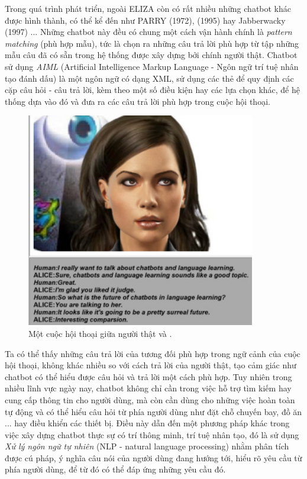 \documentclass[12pt]{report}
\begin{document}
Trong quá trình phát triển, ngoài ELIZA còn có rất nhiều những chatbot khác được hình thành, có thể kể đến như PARRY (1972), \alice{} (1995) hay Jabberwacky (1997) ... Những chatbot này đều có chung một cách vận hành chính là \textit{pattern matching} (phù hợp mẫu), tức là chọn ra những câu trả lời phù hợp từ tập những mẫu câu đã có sẵn trong hệ thống được xây dựng bởi chính người thật. Chatbot \alice{} sử dụng \textit{AIML} (Artificial Intelligence Markup Language - Ngôn ngữ trí tuệ nhân tạo đánh dấu) là một ngôn ngữ có dạng XML, sử dụng các thẻ để quy định các cặp câu hỏi - câu trả lời, kèm theo một số điều kiện hay các lựa chọn khác, để hệ thống dựa vào đó và đưa ra các câu trả lời phù hợp trong cuộc hội thoại.

\begin{figure}[H]
  \centering
    \includegraphics[width=10cm]{Pics/Chap1/alice.jpg}
  \caption{Một cuộc hội thoại giữa người thật và \alice{}.}
\end{figure}

Ta có thể thấy những câu trả lời của \alice{} tương đối phù hợp trong ngữ cảnh của cuộc hội thoại, không khác nhiều so với cách trả lời của người thật, tạo cảm giác như chatbot có thể hiểu được câu hỏi và trả lời một cách phù hợp. Tuy nhiên trong nhiều lĩnh vực ngày nay, chatbot không chỉ cần trong việc hỗ trợ tìm kiếm hay cung cấp thông tin cho người dùng, mà còn cần dùng cho những việc hoàn toàn tự động và có thể hiểu câu hỏi từ phía người dùng như đặt chỗ chuyến bay, đồ ăn ... hay điều khiển các thiết bị. Điều này dẫn đến một phương pháp khác trong việc xây dựng chatbot thực sự có trí thông minh, trí tuệ nhân tạo, đó là sử dụng \textit{Xử lý ngôn ngữ tự nhiên} (NLP - natural language processing) nhằm phân tích được cú pháp, ý nghĩa câu nói của người dùng đang hướng tới, hiểu rõ yêu cầu từ phía người dùng, để từ đó có thể đáp ứng những yêu cầu đó.
\end{document}
